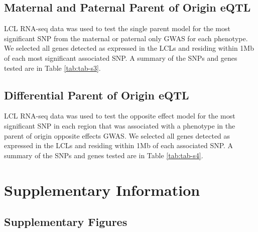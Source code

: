 \subsection{Maternal and Paternal Parent of Origin eQTL}\label{Maternal and Paternal Parent of Origin Parent of Origin eQTL}

LCL RNA-seq data was used to test the single parent model for the most significant SNP from the maternal or paternal only GWAS for each phenotype. We selected all genes detected as expressed in the LCLs and residing within 1Mb of each most significant associated SNP. A summary of the SNPs and genes tested are in Table \ref{tab:tab-s3}.

\subsection{Differential Parent of Origin eQTL}\label{Differential Parent of Origin eQTL}

LCL RNA-seq data was used to test the opposite effect model for the most significant SNP in each region that was associated with a phenotype in the parent of origin opposite effects GWAS. We selected all genes detected as expressed in the LCLs and residing within 1Mb of each associated SNP. A summary of the SNPs and genes tested are in Table \ref{tab:tab-s4}.

\clearpage
\section{Supplementary Information}\label{fig-supplementary-information}

\subsection{Supplementary Figures}\label{fig-supplementary-figures}
\renewcommand\theContinuedFloat{\alph{ContinuedFloat}}
 
